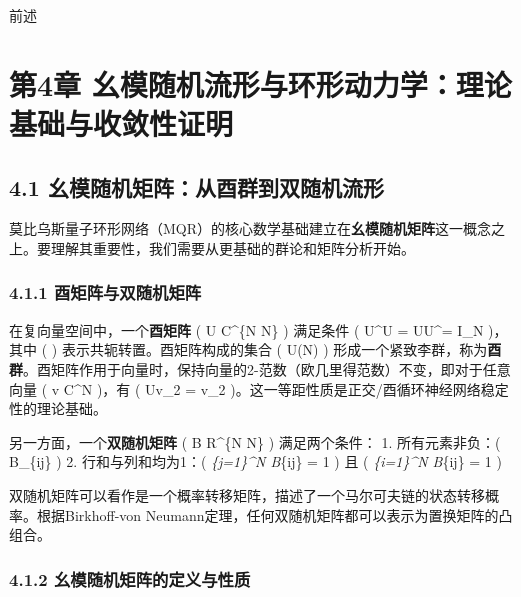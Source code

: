 \documentclass[
  12pt,
]{article}
\begin{document}
前述

\hypertarget{ux7b2c4ux7ae0-ux5e7aux6a21ux968fux673aux6d41ux5f62ux4e0eux73afux5f62ux52a8ux529bux5b66ux7406ux8bbaux57faux7840ux4e0eux6536ux655bux6027ux8bc1ux660e}{%
\section{第4章
幺模随机流形与环形动力学：理论基础与收敛性证明}\label{ux7b2c4ux7ae0-ux5e7aux6a21ux968fux673aux6d41ux5f62ux4e0eux73afux5f62ux52a8ux529bux5b66ux7406ux8bbaux57faux7840ux4e0eux6536ux655bux6027ux8bc1ux660e}}

\hypertarget{ux5e7aux6a21ux968fux673aux77e9ux9635ux4eceux9149ux7fa4ux5230ux53ccux968fux673aux6d41ux5f62}{%
\subsection{4.1
幺模随机矩阵：从酉群到双随机流形}\label{ux5e7aux6a21ux968fux673aux77e9ux9635ux4eceux9149ux7fa4ux5230ux53ccux968fux673aux6d41ux5f62}}

莫比乌斯量子环形网络（MQR）的核心数学基础建立在\textbf{幺模随机矩阵}这一概念之上。要理解其重要性，我们需要从更基础的群论和矩阵分析开始。

\hypertarget{ux9149ux77e9ux9635ux4e0eux53ccux968fux673aux77e9ux9635}{%
\subsubsection{4.1.1
酉矩阵与双随机矩阵}\label{ux9149ux77e9ux9635ux4e0eux53ccux968fux673aux77e9ux9635}}

在复向量空间中，一个\textbf{酉矩阵} ( U \in C\^{}\{N \times N\}
) 满足条件 ( U\^{}\dagger U = UU\^{}\dagger = I\_N )，其中 ( \dagger )
表示共轭转置。酉矩阵构成的集合 ( U(N) )
形成一个紧致李群，称为\textbf{酉群}。酉矩阵作用于向量时，保持向量的2-范数（欧几里得范数）不变，即对于任意向量
( v \in C\^{}N )，有 ( \textbar Uv\textbar\_2 =
\textbar v\textbar\_2
)。这一等距性质是正交/酉循环神经网络稳定性的理论基础。

另一方面，一个\textbf{双随机矩阵} ( B \in R\^{}\{N \times N\} )
满足两个条件： 1. 所有元素非负：( B\_\{ij\}  ) 2.
行和与列和均为1：( \sum\emph{\{j=1\}\^{}N B}\{ij\} = 1 ) 且 (
\sum\emph{\{i=1\}\^{}N B}\{ij\} = 1 )

双随机矩阵可以看作是一个概率转移矩阵，描述了一个马尔可夫链的状态转移概率。根据Birkhoff-von
Neumann定理，任何双随机矩阵都可以表示为置换矩阵的凸组合。

\hypertarget{ux5e7aux6a21ux968fux673aux77e9ux9635ux7684ux5b9aux4e49ux4e0eux6027ux8d28}{%
\subsubsection{4.1.2
幺模随机矩阵的定义与性质}\label{ux5e7aux6a21ux968fux673aux77e9ux9635ux7684ux5b9aux4e49ux4e0eux6027ux8d28}}
\end{document}
